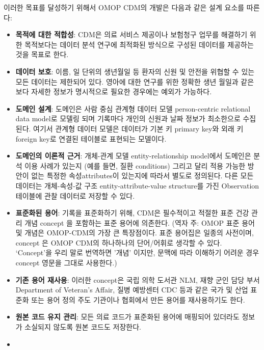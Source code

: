 \documentclass[10.5pt]{book}
\providecommand{\tightlist}{%
  \setlength{\itemsep}{0pt}\setlength{\parskip}{0pt}}
\theoremstyle{definition}
\theoremstyle{definition}
\theoremstyle{definition}
\theoremstyle{remark}
\begin{document}
이러한 목표를 달성하기 위해서 OMOP CDM의 개발은 다음과 같은 설계 요소를
따른다:

\begin{itemize}
\tightlist
\item
  \textbf{목적에 대한 적합성}: CDM은 의료 서비스 제공이나 보험청구
  업무를 해결하기 위한 목적보다는 데이터 분석 연구에 최적화된 방식으로
  구성된 데이터를 제공하는 것을 목표로
  한다.
\item
  \textbf{데이터 보호}: 이름, 일 단위의 생년월일 등 환자의 신원 및
  안전을 위협할 수 있는 모든 데이터는 제한되어 있다. 영아에 대한 연구를
  위한 정확한 생년 월일과 같은 보다 자세한 정보가 명시적으로 필요한
  경우에는 예외가 가능하다.
\item
  \textbf{도메인 설계}: 도메인은 사람 중심 관계형 데이터 모델
  person-centric relational data model로 모델링 되며 기록마다 개인의
  신원과 날짜 정보가 최소한으로 수집된다. 여기서 관계형 데이터 모델은
  데이터가 기본 키 primary key와 외래 키 foreign key로 연결된 테이블로
  표현되는 모델이다.
\item
  \textbf{도메인의 이론적 근거}: 개체-관계 모델 entity-relationship
  model에서 도메인은 분석 이용 사례가 있는지 (예를 들면, 질환
  conditions) 그리고 달리 적용 가능한 방안이 없는 특정한
  속성attributes이 있는지에 따라서 별도로 정의된다. 다른 모든 데이터는
  개체-속성-값 구조 entity-attribute-value structure를 가진 Observation
  테이블에 관찰 데이터로 저장할 수
  있다.
\item
  \textbf{표준화된 용어}: 기록을 표준화하기 위해, CDM은 필수적이고
  적절한 표준 건강 관리 개념 concept 을 포함하는 표준 용어에 의존한다.
  (역자 주: OMOP 표준 용어 및 개념은 OMOP-CDM의 가장 큰 특장점이다. 표준
  용어집은 일종의 사전이며, concept 은 OMOP CDM의 하나하나의 단어/어휘로
  생각할 수 있다. `Concept'을 우리 말로 번역하면 '개념' 이지만, 문맥에
  따라 이해하기 어려운 경우 concept 영문을 그대로 사용한다.)
\item
  \textbf{기존 용어 재사용}: 이러한 concept은 국립 의학 도서관 NLM, 재향
  군인 담당 부서 Department of Veteran's Affair, 질병 예방센터 CDC 등과
  같은 국가 및 산업 표준화 또는 용어 정의 주도 기관이나 협회에서 만든
  용어를 재사용하기도 한다.
\item
  \textbf{원본 코드 유지 관리}: 모든 의료 코드가 표준화된 용어에
  매핑되어 있더라도 정보가 소실되지 않도록 원본 코드도
  저장한다.
\item

\end{itemize}
\end{document}
